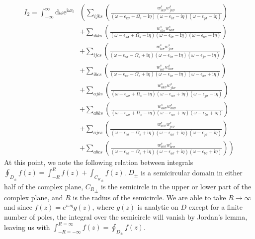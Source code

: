 \documentclass[12pt]{caltech_thesis}
\begin{document}
\begin{equation}
\begin{aligned}
I_2 = \int_{-\infty }^{\infty }\mathrm{d} \omega \mathrm{e}^{\mathrm{i \omega \eta}} 
& \left( \sum_{ijks} \left( \frac{w_{i k \sigma}^s w_{j k \sigma}^s}{(\omega-\epsilon_{k \sigma}+\Omega_s-\mathrm{i} \eta)(\omega-\epsilon_{i \sigma}-\mathrm{i} \eta)(\omega-\epsilon_{j \sigma}-\mathrm{i} \eta)} \right) \right.\\
& \left. + \sum_{ibks} \left( \frac{w_{i k \sigma}^s w_{b k \sigma}^s}{(\omega-\epsilon_{k \sigma}+\Omega_s-\mathrm{i} \eta)(\omega-\epsilon_{i \sigma}-\mathrm{i} \eta)(\omega-\epsilon_{b \sigma}+\mathrm{i} \eta)} \right) \right.\\
& \left. + \sum_{ijcs} \left( \frac{w_{i c \sigma}^s w_{j c \sigma}^s}{(\omega-\epsilon_{c \sigma}-\Omega_s+\mathrm{i} \eta)(\omega-\epsilon_{i \sigma}-\mathrm{i} \eta)(\omega-\epsilon_{j \sigma}-\mathrm{i} \eta)} \right) \right.\\
& \left. + \sum_{ibcs} \left( \frac{w_{i c \sigma}^s w_{b c \sigma}^s}{(\omega-\epsilon_{c \sigma}-\Omega_s+\mathrm{i} \eta)(\omega-\epsilon_{i \sigma}-\mathrm{i} \eta)(\omega-\epsilon_{b \sigma}+\mathrm{i} \eta)} \right) \right. \\
& \left. + \sum_{ajks} \left( \frac{w_{a k \sigma}^s w_{j k \sigma}^s}{(\omega-\epsilon_{k \sigma}+\Omega_s-\mathrm{i} \eta)(\omega-\epsilon_{a \sigma}+\mathrm{i} \eta)(\omega-\epsilon_{j \sigma}-\mathrm{i} \eta)} \right) \right.\\
& \left. + \sum_{abks} \left( \frac{w_{a k \sigma}^s w_{b k \sigma}^s}{(\omega-\epsilon_{k \sigma}+\Omega_s-\mathrm{i} \eta)(\omega-\epsilon_{a \sigma}+\mathrm{i} \eta)(\omega-\epsilon_{b \sigma}+\mathrm{i} \eta)} \right) \right.\\
& \left. + \sum_{ajcs} \left( \frac{w_{a c \sigma}^s w_{j c \sigma}^s}{(\omega-\epsilon_{c \sigma}-\Omega_s+\mathrm{i} \eta)(\omega-\epsilon_{a \sigma}+\mathrm{i} \eta)(\omega-\epsilon_{j \sigma}-\mathrm{i} \eta)} \right) \right.\\
& \left. + \sum_{abcs} \left( \frac{w_{a c \sigma}^s w_{b c \sigma}^s}{(\omega-\epsilon_{c \sigma}-\Omega_s+\mathrm{i} \eta)(\omega-\epsilon_{a \sigma}+\mathrm{i} \eta)(\omega-\epsilon_{b \sigma}+\mathrm{i} \eta)} \right) \right)
\label{eqnexpanded_integral}
\end{aligned}
\end{equation}
At this point, we note the following relation between integrals $\oint_{D_{\pm}} f(z) = \int_{-R}^R f(z) + \int_{{C_R}_{\pm}} f(z)$. $D_{\pm}$ is a semicircular domain in either half of the complex plane, ${C_R}_{\pm}$ is the semicircle in the upper or lower part of the complex plane, and $R$ is the radius of the semicircle. We are able to take $R\rightarrow \infty$ and since $f(z)=e^{i\omega \eta}g(z)$, where $g(z)$ is analytic on $D$ except for a finite number of poles, the integral over the semicircle will vanish by Jordan's lemma\autocite{JordanLemma}, leaving us with $\int_{-R=-\infty}^{R=\infty} f(z)= \oint_{D_{\pm}} f(z)$. 
\end{document}
